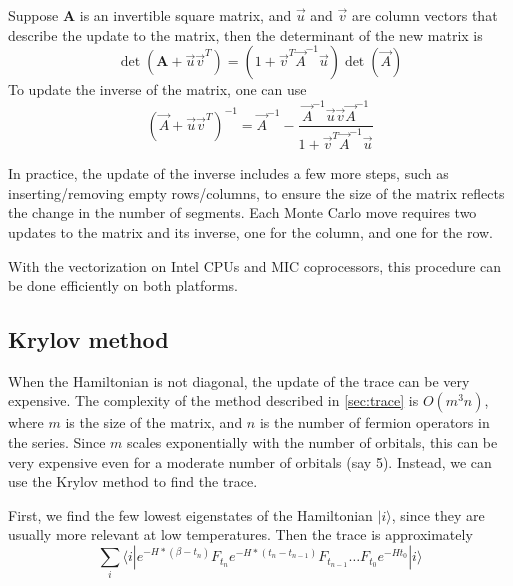 Suppose $\mathbf A$ is an invertible square matrix, and $\vec{u}$ and $\vec{v}$
are column vectors that describe the update to the matrix, then the determinant
of the new matrix is
\begin{equation}
\det({\mathbf A}+\vec{u}\vec{v}^T)=(1+\vec{v}^T\vec{A}^{-1}\vec{u})\det(\vec{A})
\end{equation}
To update the inverse of the matrix, one can use
\begin{equation}
(\vec{A}+\vec{u}\vec{v}^T)^{-1}=\vec{A}^{-1}-
\frac{\vec{A}^{-1}\vec{u}\vec{v}\vec{A}^{-1}}{1+\vec{v}^T\vec{A}^{-1}\vec{u}}
\end{equation}

In practice, the update of the inverse includes a few more steps, such as 
inserting/removing empty rows/columns, to ensure the size of the matrix 
reflects the change in the number of segments. Each Monte Carlo move requires two
updates to the matrix and its inverse, one for the column, and one for the row.

With the vectorization on Intel CPUs and MIC coprocessors, this procedure can 
be done efficiently on both platforms.



\subsection{Krylov method}
\label{sec:cthyb_krylov}
When the Hamiltonian is not diagonal, the update of the trace can be very expensive.
 The complexity of the method described in \ref{sec:trace}
 is $O(m^3n)$, where $m$ is the size of the 
matrix, and $n$ is the number of fermion operators in the series. Since $m$ 
scales exponentially with the number of orbitals, this can be 
very expensive even for a moderate number of orbitals (say 5). Instead, we can 
use the Krylov method\cite{PhysRevB.80.235117} to find the trace.

First, we find the few lowest eigenstates of the Hamiltonian $|i\rangle$, since 
they are usually more relevant at low temperatures. Then the trace is 
approximately
\[
\sum_i\langle i|  e^{-H*(\beta-t_n)}F_{t_n}e^{-H*(t_n-t_{n-1})}F_{t_{n-1}}
\ldots F_{t_0}e^{-Ht_0}  |i\rangle
\]

